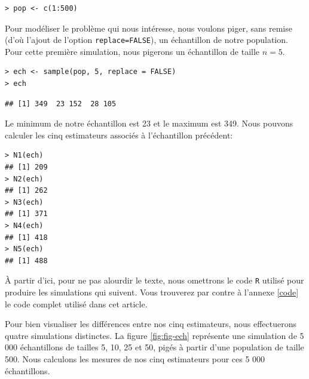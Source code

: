 \documentclass[10pt]{article}
\begin{document}
\begin{verbatim}
> pop <- c(1:500)
\end{verbatim}

Pour modéliser le problème qui nous intéresse, nous voulons piger, sans
remise (d'où l'ajout de l'option \texttt{replace=FALSE}), un échantillon
de notre population. Pour cette première simulation, nous pigerons un
échantillon de taille \(n=5\).

\begin{verbatim}
> ech <- sample(pop, 5, replace = FALSE)
> ech
\end{verbatim}

\begin{verbatim}
## [1] 349  23 152  28 105
\end{verbatim}

Le minimum de notre échantillon est 23 et le maximum est 349. Nous
pouvons calculer les cinq estimateurs associés à l'échantillon
précédent:

\begin{verbatim}
> N1(ech)
## [1] 209
> N2(ech)
## [1] 262
> N3(ech)
## [1] 371
> N4(ech)
## [1] 418
> N5(ech)
## [1] 488
\end{verbatim}

À partir d'ici, pour ne pas alourdir le texte, nous omettrons le code
\texttt{R} utilisé pour produire les simulations qui suivent. Vous
trouverez par contre à l'annexe \ref{code} le code complet utilisé dans
cet article.

Pour bien visualiser les différences entre nos cinq estimateurs, nous
effectuerons quatre simulations distinctes. La figure \ref{fig:fig-ech}
représente une simulation de 5 000 échantillons de tailles 5, 10, 25 et
50, pigés à partir d'une population de taille 500. Nous calculons les
mesures de nos cinq estimateurs pour ces 5 000 échantillons.
\end{document}
